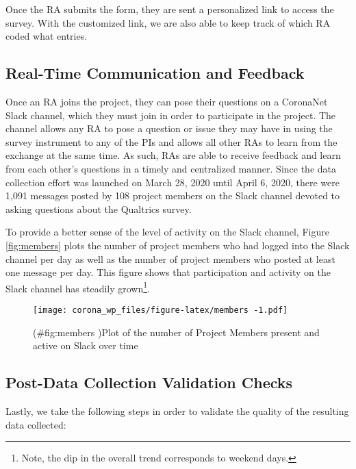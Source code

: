 \documentclass[]{article}
\let\rmarkdownfootnote\footnote%
\def\footnote{\protect\rmarkdownfootnote}
\begin{document}
Once the RA submits the form, they are sent a personalized link to access the survey. With the customized link, we are also able to keep track of which RA coded what entries.

\hypertarget{real-time-communication-and-feedback}{%
\subsection{Real-Time Communication and Feedback}\label{real-time-communication-and-feedback}}

Once an RA joins the project, they can pose their questions on a CoronaNet Slack channel, which they must join in order to participate in the project. The channel allows any RA to pose a question or issue they may have in using the survey instrument to any of the PIs and allows all other RAs to learn from the exchange at the same time. As such, RAs are able to receive feedback and learn from each other's questions in a timely and centralized manner. Since the data collection effort was launched on March 28, 2020 until April 6, 2020, there were 1,091 messages posted by 108 project members on the Slack channel devoted to asking questions about the Qualtrics survey.

To provide a better sense of the level of activity on the Slack channel, Figure \ref{fig:members} plots the number of project members who had logged into the Slack channel per day as well as the number of project members who posted at least one message per day. This figure shows that participation and activity on the Slack channel has steadily grown\footnote{Note, the dip in the overall trend corresponds to weekend days.}.

\begin{figure}
\centering
\texttt{[image: corona\_wp\_files/figure-latex/members -1.pdf]}
\caption{(\#fig:members )Plot of the number of Project Members present and active on Slack over time}
\end{figure}

\hypertarget{post-data-collection-validation-checks}{%
\subsection{Post-Data Collection Validation Checks}\label{post-data-collection-validation-checks}}

Lastly, we take the following steps in order to validate the quality of the resulting data collected:
\end{document}
